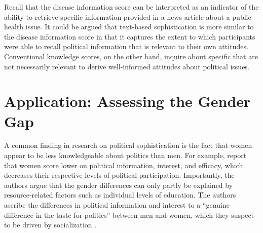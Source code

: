 \documentclass[12pt]{article}
\begin{document}
Recall that the disease information score can be interpreted as an indicator of the ability to retrieve specific information provided in a news article about a public health issue. It could be argued that text-based sophistication is more similar to the disease information score in that it captures the extent to which participants were able to recall political information that is relevant to their own attitudes. Conventional knowledge scores, on the other hand, inquire about specific that are not necessarily relevant to derive well-informed attitudes about political issues.


\section*{Application: Assessing the Gender Gap}



A common finding in research on political sophistication is the fact that women appear to be less knowledgeable about politics than men. For example, \citet{verba1997knowing} report that women score lower on political information, interest, and efficacy, which decreases their respective levels of political participation. Importantly, the authors argue that the gender differences can only partly be explained by resource-related factors such as individual levels of education. The authors ascribe the differences in political information and interest to a ``genuine difference in the taste for politics'' between men and women, which they suspect to be driven by socialization \citep[see also][]{wolak2011roots}.
\end{document}
